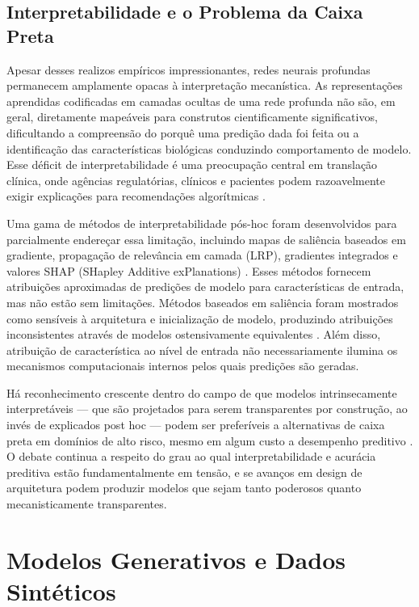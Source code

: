 \subsection{Interpretabilidade e o Problema da Caixa Preta}

Apesar desses realizos empíricos impressionantes, redes neurais profundas permanecem amplamente opacas à interpretação mecanística. As representações aprendidas codificadas em camadas ocultas de uma rede profunda não são, em geral, diretamente mapeáveis para construtos cientificamente significativos, dificultando a compreensão do porquê uma predição dada foi feita ou a identificação das características biológicas conduzindo comportamento de modelo. Esse déficit de interpretabilidade é uma preocupação central em translação clínica, onde agências regulatórias, clínicos e pacientes podem razoavelmente exigir explicações para recomendações algorítmicas \parencite{rudin2019}.

Uma gama de métodos de interpretabilidade pós-hoc foram desenvolvidos para parcialmente endereçar essa limitação, incluindo mapas de saliência baseados em gradiente, propagação de relevância em camada (LRP), gradientes integrados e valores SHAP (SHapley Additive exPlanations) \parencite{lundberg2017, sundararajan2017}. Esses métodos fornecem atribuições aproximadas de predições de modelo para características de entrada, mas não estão sem limitações. Métodos baseados em saliência foram mostrados como sensíveis à arquitetura e inicialização de modelo, produzindo atribuições inconsistentes através de modelos ostensivamente equivalentes \parencite{adebayo2018}. Além disso, atribuição de característica ao nível de entrada não necessariamente ilumina os mecanismos computacionais internos pelos quais predições são geradas.

Há reconhecimento crescente dentro do campo de que modelos intrinsecamente interpretáveis --- que são projetados para serem transparentes por construção, ao invés de explicados post hoc --- podem ser preferíveis a alternativas de caixa preta em domínios de alto risco, mesmo em algum custo a desempenho preditivo \parencite{rudin2019}. O debate continua a respeito do grau ao qual interpretabilidade e acurácia preditiva estão fundamentalmente em tensão, e se avanços em design de arquitetura podem produzir modelos que sejam tanto poderosos quanto mecanisticamente transparentes.

\section{Modelos Generativos e Dados Sintéticos}

